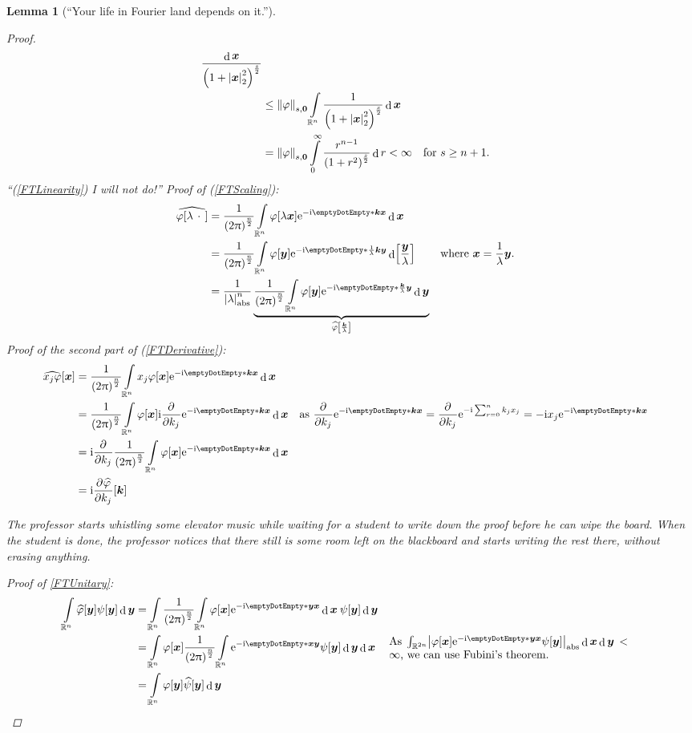 \documentclass[10pt]{article}
\newtheorem*{lemma}{Lemma}
\DeclarePairedDelimiter\doubleBars{\Vert}{\Vert}
\DeclarePairedDelimiter\singleBars{\lvert}{\rvert}
\DeclarePairedDelimiter\parentheses{\lparen}{\rparen}
\DeclarePairedDelimiter\squareBrackets{[}{]}
\newcommand\I{\mathrm{i}}
\newcommand\E{\mathrm{e}}
\DeclareMathOperator{\diffd}{d}
\newcommand\ft\widehat
\newcommand\pderiv[3][]{\frac{\partial^{#1} #3}{{\partial {#2}}^{#1}}}
\newcommand{\pderivop}[2][]{\pderiv[#1]{#2}{}}
\newcommand{\R}{\mathbb{R}}
\newcommand\of[1]{\parentheses*{#1}}
\newcommand\pa[1]{\parentheses*{#1}}
\newcommand\abs[1]{\singleBars*{#1}}
\newcommand\norm[1]{\singleBars*{#1}}
\newcommand{\SchwartzNorm}[3]{\doubleBars*{#3}_{#1,#2}}
\newcommand\scal[2]{\emptyDotEmpty*{#1}{#2}}
\newcommand\gl\lambda
\newcommand\gj\varphi
\newcommand\gy\psi
\newcommand{\vx}{{\vectorsym x}}
\newcommand{\vy}{{\vectorsym y}}
\newcommand{\vk}{{\vectorsym k}}
\newcommand{\nullmi}{{\vectorsym 0}}
\newcommand\placeholder{\,\:\cdot\:\,}
\renewcommand\of[1]{\squareBrackets*{#1}}
\renewcommand\norm[1]{\singleBars*{#1}_{2}}
\renewcommand\abs[1]{\singleBars*{#1}_{\mathrm{abs}}}
\newcommand\Int[1]{\int\limits_{#1}}
\newcommand{\Rn}{{\R^n}}
\newcommand{\ftnrm}{\frac{1}{\pa{2\Pi}^\frac{n}{2}} }
\newcommand\commutatorentbox[1]{\parbox{7.5cm}{#1}}
\begin{document}
\begin{lemma}[``Your life in Fourier land depends on it.'']
\begin{proof}
\begin{align*}
        \frac{\diffd\vx}{\pa{1+\norm{\vx}^2}^\frac{s}{2}}  \\
        &\leq \SchwartzNorm s\nullmi\gj \Int\Rn\frac{1}{\pa{1+\norm{\vx}^2}^\frac{s}{2}}\diffd\vx\\
        &= \SchwartzNorm s\nullmi\gj \intop_0^\infty\frac{r^{n-1}}{\pa{1+r^2}^\frac{s}{2}}\diffd r
        < \infty &&\text{for } s\geq n+1\text{.}
      \end{align*}
      ``(\ref{FTLinearity}) I will not do!''
      Proof of (\ref{FTScaling}):
      \begin{align*}
        \ft{\gj\of{\gl\placeholder}} 
        &= \ftnrm\Int\Rn\gj\of{\gl\vx}\E^{-\I\scal\vk\vx} \diffd\vx \\
        &= \ftnrm\Int\Rn\gj\of\vy\E^{-\I\scal{\frac1\gl\vk}{\vy}} \diffd\of{\frac{\vy}{\gl}}
          && \text{where } \vx=\frac1\gl\vy\text{.} \\
        &= \frac{1}{\abs\gl^n} \underbrace{
          \ftnrm\Int\Rn\gj\of\vy\E^{-\I\scal{\frac\vk\gl}\vy}
          \diffd\vy}_{\ft\gj\of{\frac\vk{\gl}}}
      \end{align*}
      Proof of the second part of (\ref{FTDerivative}):
      \begin{align*}
        \ft{x_j\gj}\of\vx 
        &= \ftnrm\Int\Rn x_j\gj\of{\vx}\E^{-\I\scal\vk\vx}\diffd\vx \\
        &= \ftnrm
          \Int\Rn\gj\of{\vx}\I\pderivop{k_j}\E^{-\I\scal\vk\vx} \diffd\vx 
          && \text{as }\pderivop{k_j}\E^{-\I\scal\vk\vx} =
            \pderivop{k_j}\E^{-\I\sum_{r=0}^n k_j x_j}=-\I x_j \E^{-\I\scal\vk\vx}\\
        &= \I\pderivop{k_j}\ftnrm
          \Int\Rn\gj\of\vx\E^{-\I\scal\vk\vx} \diffd\vx \\
        &= \I\pderiv{k_j}{\ft\gj}\of\vk
      \end{align*}
      
      \emph{The professor starts whistling some elevator music while waiting for a student to write down the proof before he can wipe the board. When the student is done, the professor notices that there still is some room left on the blackboard and starts writing the rest there, without erasing anything.}
      
      Proof of \ref{FTUnitary}:
      \begin{align*}
        \Int\Rn\ft\gj\of\vy \gy\of\vy \diffd\vy
        &= \Int\Rn\ftnrm\Int\Rn\gj\of\vx
          \E^{-\I\scal\vy\vx}\diffd\vx\:\gy\of\vy\diffd\vy \\
        &= \Int\Rn\gj\of\vx\ftnrm\Int\Rn
          \E^{-\I\scal\vx\vy}\gy\of\vy\diffd\vy\diffd\vx
          && \commutatorentbox{As $\int_{\R^{2n}}\abs{\gj\of\vx
          \E^{-\I\scal\vy\vx}\gy\of\vy}\diffd\vx\diffd\vy<\infty$,
          we can use Fubini's theorem.} \\
        &=\Int\Rn\gj\of\vy \ft\gy\of\vy \diffd\vy
      \end{align*}
      
      
    \end{proof}
  \end{lemma}
  
\end{document}
